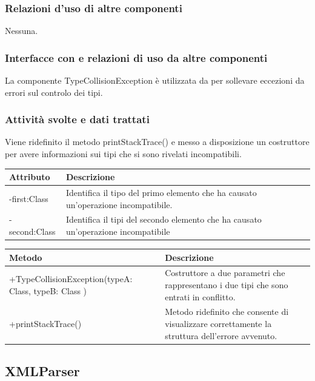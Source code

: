 \documentclass[11pt,titlepage,a4paper]{report}
\begin{document}
\subsubsection{Relazioni d'uso di altre componenti}
Nessuna.
\subsubsection{Interfacce con e relazioni di uso da altre componenti}
La componente TypeCollisionException \`e utilizzata da \brp per sollevare eccezioni da errori sul controlo dei tipi.
\subsubsection{Attivit\`a svolte e dati trattati}
Viene ridefinito il metodo printStackTrace() e messo a disposizione un costruttore per avere informazioni sui tipi che si sono rivelati incompatibili.
\begin{center}
\begin{tabular}{||p{6cm}||p{6cm}||} \hline
\hline
Attributo & Descrizione \\  \hline
-first:Class & Identifica il tipo del primo elemento che ha causato un'operazione incompatibile. \\ \hline
-second:Class & Identifica il tipi del secondo elemento che ha causato un'operazione incompatibile \\ \hline
\end{tabular}
\end{center}
\begin{center}
\begin{tabular}{||p{6cm}||p{6cm}||} \hline
\hline
Metodo & Descrizione \\  \hline
+TypeCollisionException(typeA: Class, typeB: Class ) & Costruttore a due parametri che rappresentano i due tipi che sono entrati in conflitto.\\ \hline
+printStackTrace() & Metodo ridefinito che consente di visualizzare correttamente la struttura dell'errore avvenuto.\\ \hline
\end{tabular}
\end{center}

\subsection{XMLParser}%
\end{document}
